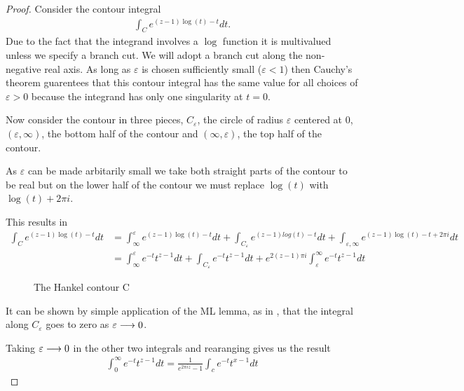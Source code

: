 \begin{proof}
Consider the contour integral
\begin{align}
    \int_C e^{(z-1)\log(t) - t} dt.
\end{align}
Due to the fact that the integrand involves a $ \log $ function it is multivalued unless we specify a branch
cut. We will adopt a branch cut along the non-negative real axis. As long as $ \varepsilon $ 
is chosen sufficiently small ($ \varepsilon < 1 $) then Cauchy's theorem guarentees that this contour 
integral has the same value for all choices of $ \varepsilon > 0 $ because the integrand has only one
singularity at $ t = 0 $.

Now consider the contour in three pieces, $ C_{\varepsilon} $, the circle of radius $ \varepsilon $ 
centered at 0, $ (\varepsilon, \infty) $, the bottom half of the contour and $ (\infty, \varepsilon) $, 
the top half of the contour. 

As $ \varepsilon $ can be made arbitarily small we take both straight parts of the contour to be
real but on the lower half of the contour we must replace $ \log(t) $ with $ \log(t) + 2\pi i $. 

This results in 
\begin{align}
    \int_C e^{(z-1)\log(t)-t} dt &= \int_\infty^\varepsilon e^{(z-1)\log(t) - t} dt + \int_{C_\varepsilon} 
        e^{(z-1)log(t) - t} dt + \int_{\varepsilon, \infty} e^{(z-1)\log(t) - t + 2\pi i} dt \\
    &= \int_\infty^\varepsilon e^{-t}t^{z-1}dt + \int_{C_\varepsilon} e^{-t}t^{z-1}dt +
    e^{2(z-1)\pi i} \int_\varepsilon^\infty e^{-t}t^{z-1} dt
\end{align}

\begin{wrapfigure}{l}{210pt}
    
    \caption{The Hankel contour C}
    \label{fig:Hankel_Loop_2}
\end{wrapfigure}

It can be shown by simple application of the ML lemma, as in \cite{Podlubny1999}, that the integral along
$ C_\varepsilon $ goes to zero as $ \varepsilon \longrightarrow 0 $.

Taking $ \varepsilon \longrightarrow 0 $ in the other two integrals and rearanging gives us the result
\begin{align}
    \label{eq:gamma_contour}
    \int_0^\infty e^{-t} t^{z-1} dt = \frac{1}{e^{2 \pi i z} - 1} \int_c e^{-t}t^{x-1} dt
\end{align}
\end{proof}

